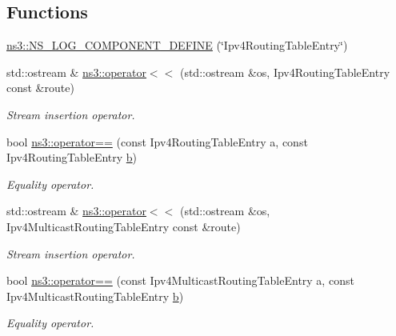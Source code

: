 \subsection*{Functions}
\begin{DoxyCompactItemize}
\item 
\hyperlink{namespacens3_a0f19703c34c8394c330cc1c98af2edae}{ns3\+::\+N\+S\+\_\+\+L\+O\+G\+\_\+\+C\+O\+M\+P\+O\+N\+E\+N\+T\+\_\+\+D\+E\+F\+I\+NE} (\char`\"{}Ipv4\+Routing\+Table\+Entry\char`\"{})
\item 
std\+::ostream \& \hyperlink{namespacens3_aff55c50294fb95c3dd0a88d4f8cf01e8}{ns3\+::operator$<$$<$} (std\+::ostream \&os, Ipv4\+Routing\+Table\+Entry const \&route)
\begin{DoxyCompactList}\small\item\em Stream insertion operator. \end{DoxyCompactList}\item 
bool \hyperlink{namespacens3_a81fd6e2e3cb41f2bfee94a3540744f84}{ns3\+::operator==} (const Ipv4\+Routing\+Table\+Entry a, const Ipv4\+Routing\+Table\+Entry \hyperlink{lte__pathloss_8m_a21ad0bd836b90d08f4cf640b4c298e7c}{b})
\begin{DoxyCompactList}\small\item\em Equality operator. \end{DoxyCompactList}\item 
std\+::ostream \& \hyperlink{namespacens3_a0af860b24c8e4bb573f3752278086a47}{ns3\+::operator$<$$<$} (std\+::ostream \&os, Ipv4\+Multicast\+Routing\+Table\+Entry const \&route)
\begin{DoxyCompactList}\small\item\em Stream insertion operator. \end{DoxyCompactList}\item 
bool \hyperlink{namespacens3_a072094843022a03dcbeb1ca4dc95ec3d}{ns3\+::operator==} (const Ipv4\+Multicast\+Routing\+Table\+Entry a, const Ipv4\+Multicast\+Routing\+Table\+Entry \hyperlink{lte__pathloss_8m_a21ad0bd836b90d08f4cf640b4c298e7c}{b})
\begin{DoxyCompactList}\small\item\em Equality operator. \end{DoxyCompactList}\end{DoxyCompactItemize}
